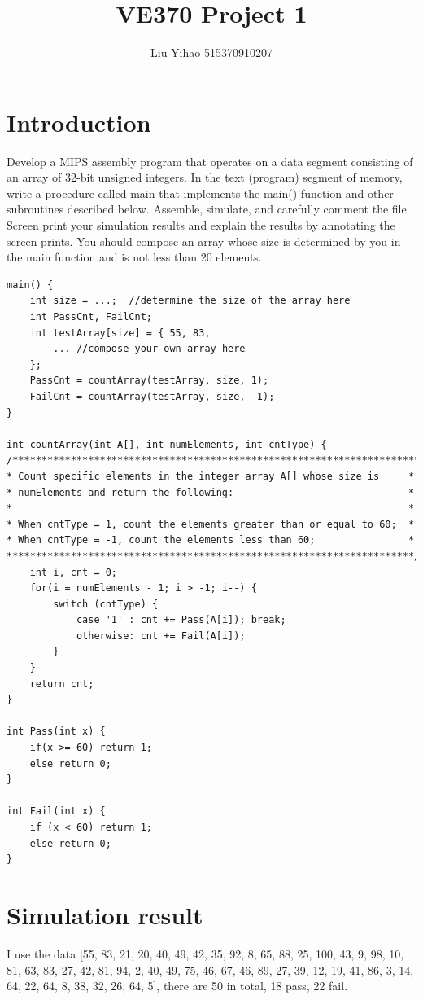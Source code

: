 \documentclass{article}
\title{VE370 Project 1}
\author{Liu Yihao 515370910207}
\date{}
\begin{document}
\maketitle

\section{Introduction}
Develop a MIPS assembly program that operates on a data segment consisting of an array of 32-bit unsigned integers. In the text (program) segment of memory, write a procedure called main that implements the main() function and other subroutines described below. Assemble, simulate, and carefully comment the file. Screen print your simulation results and explain the results by annotating the screen prints. You should compose an array whose size is determined by you in the main function and is not less than 20 elements. 

\begin{verbatim}
main() {
    int size = ...;  //determine the size of the array here
    int PassCnt, FailCnt;							
    int testArray[size] = { 55, 83,   
        ... //compose your own array here
    };				
    PassCnt = countArray(testArray, size, 1);						
    FailCnt = countArray(testArray, size, -1);						
}		
								
int countArray(int A[], int numElements, int cntType) {					
/**********************************************************************
* Count specific elements in the integer array A[] whose size is     *
* numElements and return the following:                              *
*                                                                    *
* When cntType = 1, count the elements greater than or equal to 60;  *
* When cntType = -1, count the elements less than 60;                *
**********************************************************************/
    int i, cnt = 0;									
    for(i = numElements - 1; i > -1; i--) {						
	    switch (cntType) {								
            case '1' : cnt += Pass(A[i]); break;			
            otherwise: cnt += Fail(A[i]); 			
	    }								
    }							
    return cnt;							
}							
							
int Pass(int x) {							
    if(x >= 60) return 1;						
    else return 0;						
}							
							
int Fail(int x) {							
    if (x < 60) return 1;						
    else return 0;						
}
\end{verbatim}

\section{Simulation result}
I use the data [55, 83, 21, 20, 40, 49, 42, 35, 92, 8, 65, 88, 25, 100, 43, 9, 98, 10, 81, 63, 83, 27, 42, 81, 94, 2, 40, 49, 75, 46, 67, 46, 89, 27, 39, 12, 19, 41, 86, 3, 14, 64, 22, 64, 8, 38, 32, 26, 64, 5], there are 50 in total, 18 pass, 22 fail. \\
\end{document}
